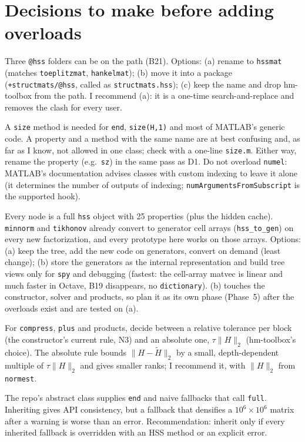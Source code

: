 \documentclass[11pt]{article}
\newcommand{\code}[1]{\texttt{#1}}
\begin{document}
\section{Decisions to make before adding overloads}\label{sec:decisions}
\begin{description}[leftmargin=1.2em,style=nextline]
\item[D1. Class name.] Three \code{@hss} folders can be on the path (B21). Options: (a) rename to
\code{hssmat} (matches \code{toeplitzmat}, \code{hankelmat}); (b) move it into a package
(\code{+structmats/\allowbreak @hss}, called as \code{structmats.hss}); (c) keep the name and drop hm-toolbox from the
path. I recommend (a): it is a one-time search-and-replace and removes the clash for every user.
\item[D2. The \code{size} property.] A \code{size} method is needed for \code{end}, \code{size(H,1)} and most
of MATLAB's generic code. A property and a method with the same name are at best confusing and, as far as I
know, not allowed in one class; check with a one-line \code{size.m}. Either way, rename the property (e.g.\
\code{sz}) in the same pass as D1. Do not overload \code{numel}: MATLAB's documentation advises classes with custom
indexing to leave it alone (it determines the number of outputs of indexing; \code{numArgumentsFromSubscript} is
the supported hook).
\item[D3. Storage: object tree or flat generators.] Every node is a full \code{hss} object with 25
properties (plus the hidden cache). \code{minnorm} and \code{tikhonov} already convert to generator cell arrays
(\code{hss\_to\_gen}) on every new factorization, and every prototype here works on those arrays.
Options: (a) keep the tree, add the new code on generators, convert on demand (least change); (b) store
the generators as the internal representation and build tree views only for \code{spy} and debugging (fastest:
the cell-array matvec is linear and much faster in Octave, B19 disappears, no \code{dictionary}). (b) touches
the constructor, solver and products, so plan it as its own phase (Phase~5) after the overloads exist and are
tested on (a).
\item[D4. Meaning of the tolerance.] For \code{compress}, \code{plus} and products, decide between a relative
tolerance per block (the constructor's current rule, N3) and an absolute one, $\tau\|H\|_2$ (hm-toolbox's
choice). The absolute rule bounds $\|H-\tilde H\|_2$ by a small, depth-dependent multiple of $\tau\|H\|_2$ and gives
smaller ranks; I recommend it, with $\|H\|_2$ from \code{normest}.
\item[D5. Inherit from \code{structuredmat}?] The repo's abstract class supplies \code{end} and naive fallbacks
that call \code{full}. Inheriting gives API consistency, but a fallback that densifies a $10^6\times10^6$
matrix after a warning is worse than an error. Recommendation: inherit only if every inherited fallback is
overridden with an HSS method or an explicit error.
\end{description}
\end{document}

